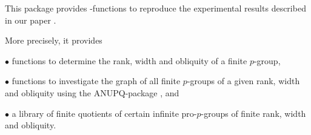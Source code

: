 

This package provides \GAP-functions to reproduce the experimental
results described in our paper \cite{ER10}.

More precisely, it provides
\beginlist
\item{$\bullet$} functions to determine the rank, width and obliquity
  of a finite $p$-group,
\item{$\bullet$} functions to investigate the graph of all finite $p$-groups of a
  given rank, width and obliquity using the ANUPQ-package \cite{ANU06}, and
\item{$\bullet$} a library of finite quotients of certain infinite pro-$p$-groups
  of finite rank, width and obliquity.
\endlist
